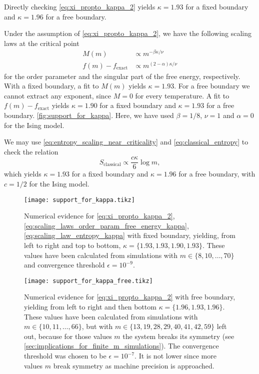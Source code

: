 Directly checking \autoref{eq:xi_propto_kappa_2} yields $\kappa = 1.93$ for a fixed boundary
and $\kappa = 1.96$ for a free boundary.

Under the assumption of \autoref{eq:xi_propto_kappa_2}, we have the following scaling laws at the critical point
\begin{align}\label{eq:scaling_laws_order_param_free_energy_kappa}
  M(m) & \propto m^{-\beta \kappa / \nu} \\
  f(m) - f_{\text{exact}} & \propto m^{(2-\alpha)\kappa / \nu}
\end{align}
for the order parameter and the singular part of the free energy, respectively.
With a fixed boundary, a fit to $M(m)$ yields $\kappa = 1.93$.
For a free boundary we cannot extract any exponent, since $M = 0$ for every temperature.
A fit to $f(m) - f_{\text{exact}}$ yields $\kappa = 1.90$ for a fixed boundary and $\kappa = 1.93$ for a free boundary.
\autoref{fig:support_for_kappa}. Here, we have used $\beta = 1/8$, $\nu = 1$ and $\alpha = 0$ for the Ising model.

We may use \autoref{eq:entropy_scaling_near_criticality} and \autoref{eq:classical_entropy} to check the
relation
\begin{equation}\label{eq:scaling_law_entropy_kappa}
  S_{\text{classical}} \propto \frac{c\kappa}{6}\log m,
\end{equation}
which yields $\kappa = 1.93$ for a fixed boundary and $\kappa = 1.96$ for a free boundary,
with $c = 1/2$ for the Ising model.

\begin{figure}
  \texttt{[image: support\_for\_kappa.tikz]}
  \caption{Numerical evidence for \autoref{eq:xi_propto_kappa_2}, \autoref{eq:scaling_laws_order_param_free_energy_kappa},
  \autoref{eq:scaling_law_entropy_kappa} with fixed boundary, yielding, from left to right and top to bottom, $\kappa = \{ 1.93, 1.93, 1.90,
  1.93 \}$. These values have been calculated from simulations with $m \in \{8, 10, \dots, 70\} $ and convergence threshold $\epsilon = 10^{-9}$. }\label{fig:support_for_kappa}
\end{figure}

\begin{figure}
  \texttt{[image: support\_for\_kappa\_free.tikz]}
  \caption{Numerical evidence for
\autoref{eq:xi_propto_kappa_2} with free boundary, yielding from left to right and then bottom $\kappa = \{ 1.96,
1.93, 1.96 \}$.
These values have been calculated from simulations with $m \in \{10,
11, \dots, 66 \}$, but with $m \in \{13, 19, 28, 29, 40, 41, 42,
59 \}$ left out, because for those values $m$ the system breaks its symmetry (see
\autoref{sec:implications_for_finite_m_simulations}).
The convergence threshold was chosen to be $\epsilon = 10^{-7}$.
It is not lower since more values $m$ break symmetry as machine precision is approached.}
\label{fig:support_for_kappa_free}
\end{figure}

